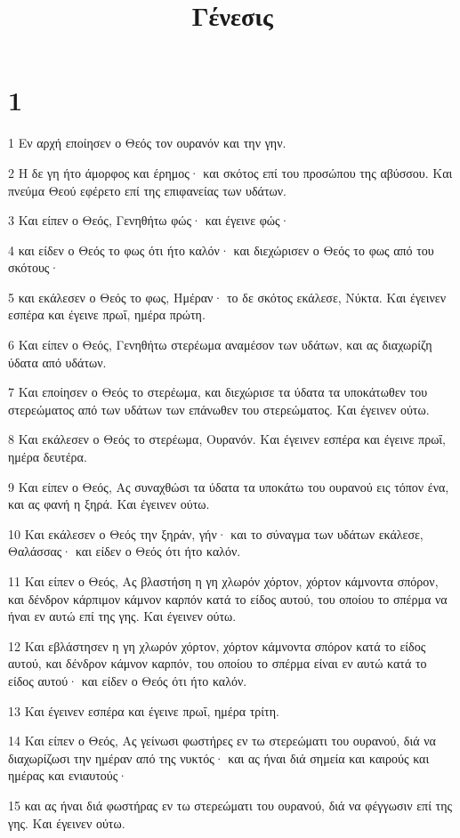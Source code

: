 

\title{Γένεσις}


\chapter{1}

\par 1 Εν αρχή εποίησεν ο Θεός τον ουρανόν και την γην.
\par 2 Η δε γη ήτο άμορφος και έρημος· και σκότος επί του προσώπου της αβύσσου. Και πνεύμα Θεού εφέρετο επί της επιφανείας των υδάτων.
\par 3 Και είπεν ο Θεός, Γενηθήτω φώς· και έγεινε φώς·
\par 4 και είδεν ο Θεός το φως ότι ήτο καλόν· και διεχώρισεν ο Θεός το φως από του σκότους·
\par 5 και εκάλεσεν ο Θεός το φως, Ημέραν· το δε σκότος εκάλεσε, Νύκτα. Και έγεινεν εσπέρα και έγεινε πρωΐ, ημέρα πρώτη.
\par 6 Και είπεν ο Θεός, Γενηθήτω στερέωμα αναμέσον των υδάτων, και ας διαχωρίζη ύδατα από υδάτων.
\par 7 Και εποίησεν ο Θεός το στερέωμα, και διεχώρισε τα ύδατα τα υποκάτωθεν του στερεώματος από των υδάτων των επάνωθεν του στερεώματος. Και έγεινεν ούτω.
\par 8 Και εκάλεσεν ο Θεός το στερέωμα, Ουρανόν. Και έγεινεν εσπέρα και έγεινε πρωΐ, ημέρα δευτέρα.
\par 9 Και είπεν ο Θεός, Ας συναχθώσι τα ύδατα τα υποκάτω του ουρανού εις τόπον ένα, και ας φανή η ξηρά. Και έγεινεν ούτω.
\par 10 Και εκάλεσεν ο Θεός την ξηράν, γήν· και το σύναγμα των υδάτων εκάλεσε, Θαλάσσας· και είδεν ο Θεός ότι ήτο καλόν.
\par 11 Και είπεν ο Θεός, Ας βλαστήση η γη χλωρόν χόρτον, χόρτον κάμνοντα σπόρον, και δένδρον κάρπιμον κάμνον καρπόν κατά το είδος αυτού, του οποίου το σπέρμα να ήναι εν αυτώ επί της γης. Και έγεινεν ούτω.
\par 12 Και εβλάστησεν η γη χλωρόν χόρτον, χόρτον κάμνοντα σπόρον κατά το είδος αυτού, και δένδρον κάμνον καρπόν, του οποίου το σπέρμα είναι εν αυτώ κατά το είδος αυτού· και είδεν ο Θεός ότι ήτο καλόν.
\par 13 Και έγεινεν εσπέρα και έγεινε πρωΐ, ημέρα τρίτη.
\par 14 Και είπεν ο Θεός, Ας γείνωσι φωστήρες εν τω στερεώματι του ουρανού, διά να διαχωρίζωσι την ημέραν από της νυκτός· και ας ήναι διά σημεία και καιρούς και ημέρας και ενιαυτούς·
\par 15 και ας ήναι διά φωστήρας εν τω στερεώματι του ουρανού, διά να φέγγωσιν επί της γης. Και έγεινεν ούτω.
